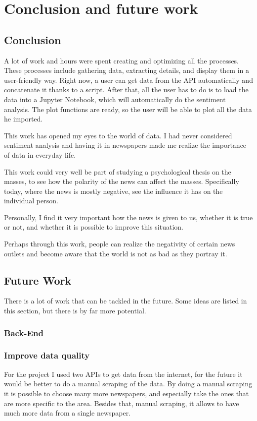 \section{Conclusion and future work}

\subsection{Conclusion}
A lot of work and hours were spent creating and optimizing all the processes. These processes include gathering data, extracting details, and display them in a user-friendly way.
Right now, a user can get data from the API automatically and concatenate it thanks to a script.
After that, all the user has to do is to load the data into a Jupyter Notebook, which will automatically do the sentiment analysis.
The \gls{plot} functions are ready, so the user will be able to \gls{plot} all the data he imported.

This work has opened my eyes to the world of data. I had never considered sentiment analysis and having it in newspapers made me realize the importance of data in everyday life.

This work could very well be part of studying a psychological thesis on the masses, to see how the polarity of the news can affect the masses.
Specifically today, where the news is mostly negative, see the influence it has on the individual person.

Personally, I find it very important how the news is given to us, whether it is true or not, and whether it is possible to improve this situation.

Perhaps through this work, people can realize the negativity of certain news outlets and become aware that the world is not as bad as they portray it.

\subsection{Future Work}
There is a lot of work that can be tackled in the future. Some ideas are listed in this section, but there is by far more potential.

\subsubsection{Back-End}
\subsubsection*{Improve data quality}
For the project I used two APIs to get data from the internet, for the future it would be better to do a manual scraping of the data.
By doing a manual scraping it is possible to choose many more newspapers, and especially take the ones that are more specific to the area.
Besides that, manual scraping, it allows to have much more data from a single newspaper.

